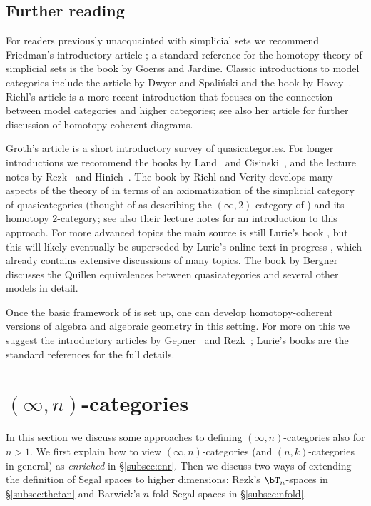 \documentclass[a4paper,12pt]{article}
\begin{document}
\subsection{Further reading}
For readers previously unacquainted with simplicial sets we recommend
Friedman's introductory article \cite{Friedman}; a standard reference
for the homotopy theory of simplicial sets is the book
\cite{GoerssJardine} by Goerss and Jardine. Classic introductions to model categories include the article
\cite{DwyerSpa} by Dwyer and Spali\'nski and the book by
Hovey~\cite{Hovey}. Riehl's article \cite{RiehlHtC} is a more recent
introduction that focuses on the connection between model categories
and higher categories; see also her article \cite{RiehlCoh} for
further discussion of homotopy-coherent diagrams.

Groth's article \cite{Groth} is a short introductory survey of
quasicategories. For longer introductions we recommend the books by
Land~\cite{LandBook} and Cisinski~\cite{CisinskiBook}, and the lecture
notes by Rezk~\cite{RezkNotes} and Hinich~\cite{HinichNotes}. The book
by Riehl and Verity \cite{RiehlVerity} develops many aspects of the
theory of \icats{} in terms of an axiomatization of the simplicial
category of quasicategories (thought of as describing the
$(\infty,2)$-category of \icats{}) and its homotopy $2$-category; see
also their lecture notes \cite{RiehlVerityNotes} for an introduction
to this approach.  For more advanced topics the main source is still
Lurie's book \cite{HTT}, but this will likely eventually be superseded
by Lurie's online text in progress \cite{Kerodon}, which already
contains extensive discussions of many topics. The book \cite{Bergner}
by Bergner discusses the Quillen equivalences between quasicategories
and several other models in detail.

Once the basic framework of \icats{} is set up, one can develop
homotopy-coherent versions of algebra and algebraic geometry in this
setting. For more on this we suggest the introductory articles by
Gepner~\cite{GepnerIntro} and Rezk~\cite{RezkSAG}; Lurie's books
\cite{HA,SAG} are the standard references for the full details.


\section{$(\infty,n)$-categories}\label{sec:incats}
In this section we discuss some approaches to defining
$(\infty,n)$-categories also for $n > 1$. We first explain how to view
$(\infty,n)$-categories (and $(n,k)$-categories in general) as
\emph{enriched} \icats{} in \S\ref{subsec:enr}. Then we discuss two ways of
extending the definition of Segal spaces to higher dimensions: Rezk's
$\bT_{n}$-spaces in \S\ref{subsec:thetan} and Barwick's $n$-fold Segal
spaces in \S\ref{subsec:nfold}. 
\end{document}
